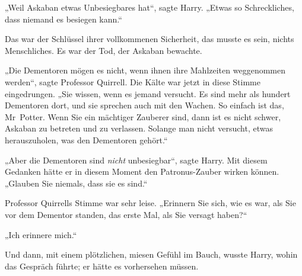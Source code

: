 „Weil Askaban etwas Unbesiegbares hat“, sagte Harry. „Etwas so Schreckliches, dass niemand es besiegen kann.“

Das war der Schlüssel ihrer vollkommenen Sicherheit, das musste es sein, nichts Menschliches. Es war der Tod, der Askaban bewachte.

„Die Dementoren mögen es nicht, wenn ihnen ihre Mahlzeiten weggenommen werden“, sagte Professor Quirrell. Die Kälte war jetzt in diese Stimme eingedrungen. „Sie wissen, wenn es jemand versucht. Es sind mehr als hundert Dementoren dort, und sie sprechen auch mit den Wachen. So einfach ist das, Mr~Potter. Wenn Sie ein mächtiger Zauberer sind, dann ist es nicht schwer, Askaban zu betreten und zu verlassen. Solange man nicht versucht, etwas herauszuholen, was den Dementoren gehört.“

„Aber die Dementoren sind \emph{nicht} unbesiegbar“, sagte Harry. Mit diesem Gedanken hätte er in diesem Moment den Patronus-Zauber wirken können. „Glauben Sie niemals, dass sie es sind.“

Professor Quirrells Stimme war sehr leise. „Erinnern Sie sich, wie es war, als Sie vor dem Dementor standen, das erste Mal, als Sie versagt haben?“

„Ich erinnere mich.“

Und dann, mit einem plötzlichen, miesen Gefühl im Bauch, wusste Harry, wohin das Gespräch führte; er hätte es vorhersehen müssen.

